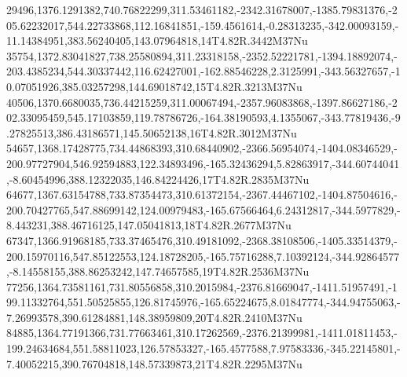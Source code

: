 29496,1376.1291382,740.76822299,311.53461182,-2342.31678007,-1385.79831376,-205.62232017,544.22733868,112.16841851,-159.4561614,-0.28313235,-342.00093159,-11.14384951,383.56240405,143.07964818,14T4.82R.3442M37Nu
35754,1372.83041827,738.25580894,311.23318158,-2352.52221781,-1394.18892074,-203.4385234,544.30337442,116.62427001,-162.88546228,2.3125991,-343.56327657,-10.07051926,385.03257298,144.69018742,15T4.82R.3213M37Nu
40506,1370.6680035,736.44215259,311.00067494,-2357.96083868,-1397.86627186,-202.33095459,545.17103859,119.78786726,-164.38190593,4.1355067,-343.77819436,-9.27825513,386.43186571,145.50652138,16T4.82R.3012M37Nu
54657,1368.17428775,734.44868393,310.68440902,-2366.56954074,-1404.08346529,-200.97727904,546.92594883,122.34893496,-165.32436294,5.82863917,-344.60744041,-8.60454996,388.12322035,146.84224426,17T4.82R.2835M37Nu
64677,1367.63154788,733.87354473,310.61372154,-2367.44467102,-1404.87504616,-200.70427765,547.88699142,124.00979483,-165.67566464,6.24312817,-344.5977829,-8.443231,388.46716125,147.05041813,18T4.82R.2677M37Nu
67347,1366.91968185,733.37465476,310.49181092,-2368.38108506,-1405.33514379,-200.15970116,547.85122553,124.18728205,-165.75716288,7.10392124,-344.92864577,-8.14558155,388.86253242,147.74657585,19T4.82R.2536M37Nu
77256,1364.73581161,731.80556858,310.2015984,-2376.81669047,-1411.51957491,-199.11332764,551.50525855,126.81745976,-165.65224675,8.01847774,-344.94755063,-7.26993578,390.61284881,148.38959809,20T4.82R.2410M37Nu
84885,1364.77191366,731.77663461,310.17262569,-2376.21399981,-1411.01811453,-199.24634684,551.58811023,126.57853327,-165.4577588,7.97583336,-345.22145801,-7.40052215,390.76704818,148.57339873,21T4.82R.2295M37Nu
